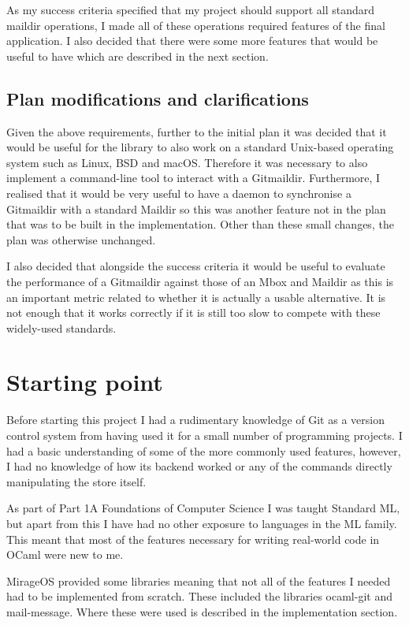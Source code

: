 As my success criteria specified that my project should support all standard maildir operations, I made all of these operations required features of the final application. I also decided that there were some more features that would be useful to have which are described in the next section.

\subsection{Plan modifications and clarifications}

Given the above requirements, further to the initial plan it was decided that it would be useful for the library to also work on a standard Unix-based operating system such as Linux, BSD and macOS. Therefore it was necessary to also implement a command-line tool to interact with a Gitmaildir. Furthermore, I realised that it would be very useful to have a daemon to synchronise a Gitmaildir with a standard Maildir so this was another feature not in the plan that was to be built in the implementation. Other than these small changes, the plan was otherwise unchanged.

I also decided that alongside the success criteria it would be useful to evaluate the performance of a Gitmaildir against those of an Mbox and Maildir as this is an important metric related to whether it is actually a usable alternative. It is not enough that it works correctly if it is still too slow to compete with these widely-used standards.

\section{Starting point}

Before starting this project I had a rudimentary knowledge of Git as a version control system from having used it for a small number of programming projects. I had a basic understanding of some of the more commonly used features, however, I had no knowledge of how its backend worked or any of the commands directly manipulating the store itself.

As part of Part 1A Foundations of Computer Science I was taught Standard ML, but apart from this I have had no other exposure to languages in the ML family. This meant that most of the features necessary for writing real-world code in OCaml were new to me.

MirageOS provided some libraries meaning that not all of the features I needed had to be implemented from scratch. These included the libraries ocaml-git and mail-message. Where these were used is described in the implementation section.

